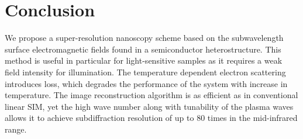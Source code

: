 \documentclass[11pt]{article}
\begin{document}
\section{Conclusion}
%
We propose a super-resolution nanoscopy scheme based on the subwavelength surface electromagnetic fields found in a semiconductor heterostructure. This method is useful in particular for light-sensitive samples as it requires a weak field intensity for illumination. The temperature dependent electron scattering introduces loss, which degrades the performance of the system with increase in temperature. The image reconstruction algorithm is as efficient as in conventional linear SIM, yet the high wave number along with tunability of the plasma waves allows it to achieve subdiffraction resolution of up to 80 times in the mid-infrared range.
\clearpage %
% 


\end{document}
